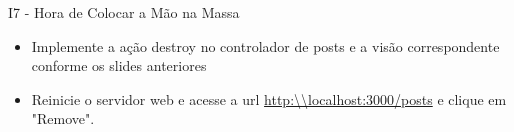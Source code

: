 \begin{frame}[t, fragile]{I7 - Hora de Colocar a Mão na Massa}
	\begin{itemize}
		
		\item Implemente a ação \alert{destroy} no controlador de posts e a visão correspondente conforme os slides anteriores
		\item Reinicie o servidor web e acesse a url \url{http:\\localhost:3000/posts} e clique em \alert{"Remove"}.
	\end{itemize}
\end{frame}